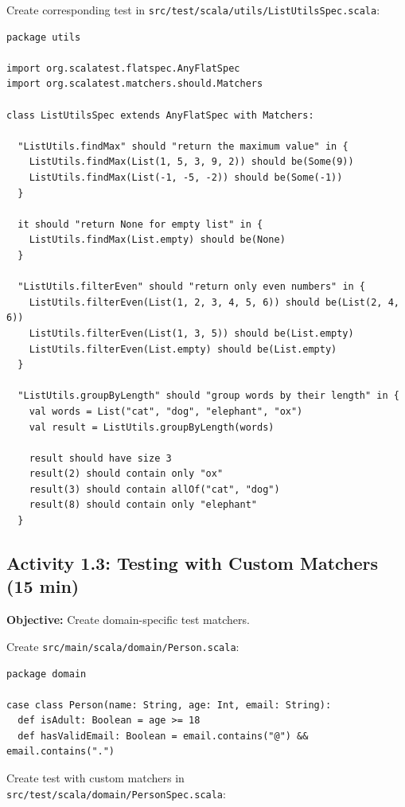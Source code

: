 \documentclass[12pt,a4paper]{article}
\begin{document}
Create corresponding test in \texttt{src/test/scala/utils/ListUtilsSpec.scala}:

\begin{lstlisting}
package utils

import org.scalatest.flatspec.AnyFlatSpec
import org.scalatest.matchers.should.Matchers

class ListUtilsSpec extends AnyFlatSpec with Matchers:
  
  "ListUtils.findMax" should "return the maximum value" in {
    ListUtils.findMax(List(1, 5, 3, 9, 2)) should be(Some(9))
    ListUtils.findMax(List(-1, -5, -2)) should be(Some(-1))
  }
  
  it should "return None for empty list" in {
    ListUtils.findMax(List.empty) should be(None)
  }
  
  "ListUtils.filterEven" should "return only even numbers" in {
    ListUtils.filterEven(List(1, 2, 3, 4, 5, 6)) should be(List(2, 4, 6))
    ListUtils.filterEven(List(1, 3, 5)) should be(List.empty)
    ListUtils.filterEven(List.empty) should be(List.empty)
  }
  
  "ListUtils.groupByLength" should "group words by their length" in {
    val words = List("cat", "dog", "elephant", "ox")
    val result = ListUtils.groupByLength(words)
    
    result should have size 3
    result(2) should contain only "ox"
    result(3) should contain allOf("cat", "dog")
    result(8) should contain only "elephant"
  }
\end{lstlisting}

\subsection{Activity 1.3: Testing with Custom Matchers (15 min)}

\textbf{Objective:} Create domain-specific test matchers.

Create \texttt{src/main/scala/domain/Person.scala}:

\begin{lstlisting}
package domain

case class Person(name: String, age: Int, email: String):
  def isAdult: Boolean = age >= 18
  def hasValidEmail: Boolean = email.contains("@") && email.contains(".")
\end{lstlisting}

Create test with custom matchers in \texttt{src/test/scala/domain/PersonSpec.scala}:
\end{document}
